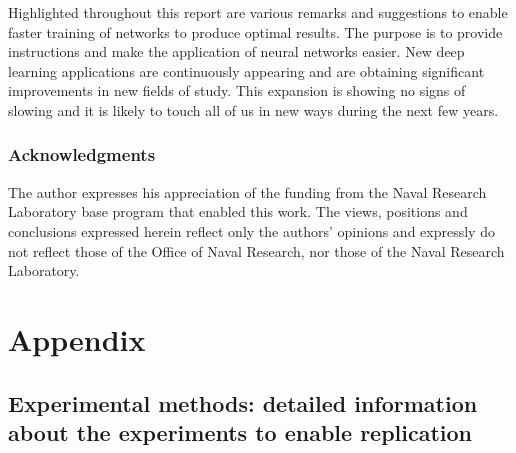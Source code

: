 \documentclass{article} %
\begin{document}
Highlighted throughout this report are various remarks and suggestions to enable faster training of networks to produce optimal results.  The purpose is to provide instructions and make the application of neural networks easier.  New deep learning applications are continuously appearing and are obtaining significant improvements in new fields of study.  This expansion is showing no signs of slowing and it is likely to touch all of us in new ways during the next few years.


\subsubsection*{Acknowledgments}

The author expresses his appreciation of the funding from the Naval Research Laboratory base program that enabled this work. The views, positions and conclusions expressed herein reflect only the authors' opinions and expressly do not reflect those of the Office of Naval Research, nor those of the Naval Research Laboratory.




\appendix


\section{Appendix}

\subsection{Experimental methods: detailed information about the experiments to enable replication}
\label{sec:exp}
\end{document}

